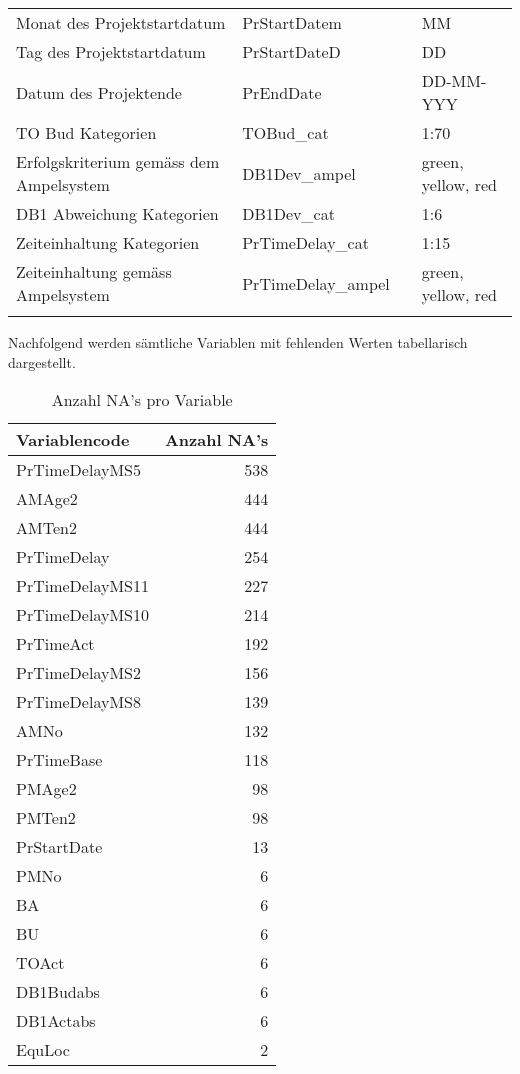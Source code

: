 \begin{landscape}
\begin{center}
\begin{longtable}{p{6cm}|p{4cm}|p{6cm}|p{3cm}}
			Monat des Projektstartdatum & PrStartDatem &       & MM \\
			Tag des Projektstartdatum & PrStartDateD &       & DD \\
			Datum des Projektende & PrEndDate &       & DD-MM-YYY \\
			TO Bud Kategorien & TOBud\_cat &       & {1:70} \\
			Erfolgskriterium gemäss dem Ampelsystem & DB1Dev\_ampel &       & {green, yellow, red} \\
			DB1 Abweichung Kategorien & DB1Dev\_cat &       & {1:6} \\
			Zeiteinhaltung Kategorien & PrTimeDelay\_cat &       & {1:15} \\
			Zeiteinhaltung gemäss Ampelsystem & PrTimeDelay\_ampel &       & {green, yellow, red} \\		
			\label{tab:addlabel}%
		\end{longtable}%
	\end{center}
\end{landscape}
Nachfolgend werden sämtliche Variablen mit fehlenden Werten tabellarisch dargestellt.
\begin{table}[htbp]
	\centering
	\caption{Anzahl NA's pro Variable}
	\begin{tabular}{lr}
		\textbf{Variablencode} & \multicolumn{1}{l}{\textbf{Anzahl NA's}} \\\hline
		PrTimeDelayMS5 & 538 \\
		AMAge2 & 444 \\
		AMTen2 & 444 \\
		PrTimeDelay & 254 \\
		PrTimeDelayMS11 & 227 \\
		PrTimeDelayMS10 & 214 \\
		PrTimeAct & 192 \\
		PrTimeDelayMS2 & 156 \\
		PrTimeDelayMS8 & 139 \\
		AMNo  & 132 \\
		PrTimeBase & 118 \\
		PMAge2 & 98 \\
		PMTen2 & 98 \\
		PrStartDate & 13 \\
		PMNo  & 6 \\
		BA    & 6 \\
		BU    & 6 \\
		TOAct & 6 \\
		DB1Budabs & 6 \\
		DB1Actabs & 6 \\
		EquLoc & 2 \\
	\end{tabular}%
	\label{tab:na}%
\end{table}%

